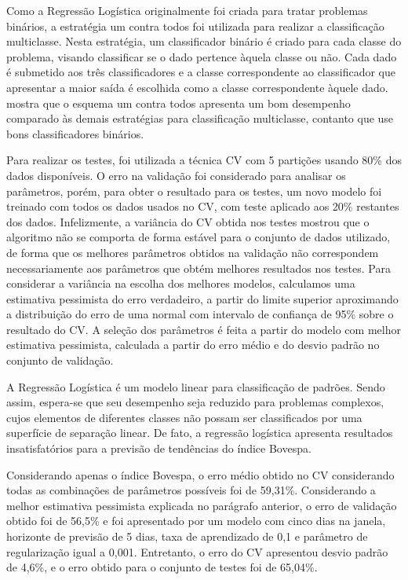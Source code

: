 \documentclass[12pt,a4paper,utf8]{ppgsi}
\begin{document}
        Como a Regressão Logística originalmente foi criada para tratar problemas binários, a estratégia um contra todos foi utilizada para realizar a classificação multiclasse. Nesta estratégia, um classificador binário é criado para cada classe do problema, visando classificar se o dado pertence àquela classe ou não. Cada dado é submetido aos três classificadores e a classe correspondente ao classificador que apresentar a maior saída é escolhida como a classe correspondente àquele dado. \cite{Rifkin2004} mostra que o esquema um contra todos apresenta um bom desempenho comparado às demais estratégias para classificação multiclasse, contanto que use bons classificadores binários.

        Para realizar os testes, foi utilizada a técnica CV com 5 partições usando 80\% dos dados disponíveis. O erro na validação foi considerado para analisar os parâmetros, porém, para obter o resultado para os testes, um novo modelo foi treinado com todos os dados usados no CV, com teste aplicado aos 20\% restantes dos dados. Infelizmente, a variância do CV obtida nos testes mostrou que o algoritmo não se comporta de forma estável para o conjunto de dados utilizado, de forma que os melhores parâmetros obtidos na validação não correspondem necessariamente aos parâmetros que obtém melhores resultados nos testes. Para considerar a variância na escolha dos melhores modelos, calculamos uma estimativa pessimista do erro verdadeiro, a partir do limite superior aproximando a distribuição do erro de uma normal com intervalo de confiança de 95\% sobre o resultado do CV. A seleção dos parâmetros é feita a partir do modelo com melhor estimativa pessimista, calculada a partir do erro médio e do desvio padrão no conjunto de validação. %

        A Regressão Logística é um modelo linear para classificação de padrões. Sendo assim, espera-se que seu desempenho seja reduzido para problemas complexos, cujos elementos de diferentes classes não possam ser classificados por uma superfície de separação linear. De fato, a regressão logística apresenta resultados insatisfatórios para a previsão de tendências do índice Bovespa.

        Considerando apenas o índice Bovespa, o erro médio obtido no CV considerando todas as combinações de parâmetros possíveis foi de 59,31\%. Considerando a melhor estimativa pessimista explicada no parágrafo anterior, o erro de validação obtido foi de 56,5\% e foi apresentado por um modelo com cinco dias na janela, horizonte de previsão de 5 dias, taxa de aprendizado de 0,1 e parâmetro de regularização igual a 0,001. Entretanto, o erro do CV apresentou desvio padrão de 4,6\%, e o erro obtido para o conjunto de testes foi de 65,04\%.
\end{document}
